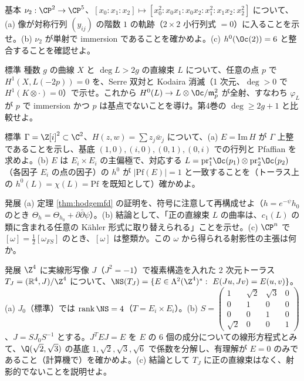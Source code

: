 \begin{prob}{基本}\label{p:veronese}
$\nu_2:\CP^2\to\CP^5$、$[x_0:x_1:x_2]\mapsto[x_0^2:x_0x_1:x_0x_2:x_1^2:x_1x_2:x_2^2]$ について、(a) 像が対称行列 $(y_{ij})$ の階数 $1$ の軌跡（$2\times2$ 小行列式 $=0$）に入ることを示せ。(b) $\nu_2$ が単射で immersion であることを確かめよ。(c) $h^0(\Oc(2))=6$ と整合することを確認せよ。
\end{prob}
\begin{prob}{標準}\label{p:curvejets}
種数 $g$ の曲線 $X$ と $\deg L>2g$ の直線束 $L$ について、任意の点 $p$ で $H^1(X,L(-2p))=0$ を、Serre 双対と Kodaira 消滅（1 次元、$\deg>0$ で $H^1(K\otimes\cdot)=0$）で示せ。これから $H^0(L)\to L\otimes\Oc/\mathfrak m_p^2$ が全射、すなわち $\varphi_L$ が $p$ で immersion かつ $p$ は基点でないことを導け。第4巻の $\deg\ge2g+1$ と比較せよ。
\end{prob}
\begin{prob}{標準}\label{p:torusPolar}
$\Gamma=\Z[i]^2\subset\C^2$、$H(z,w)=\sum z_j\bar w_j$ について、(a) $E=\mathrm{Im}\,H$ が $\Gamma$ 上整であることを示し、基底 $(1,0),(i,0),(0,1),(0,i)$ での行列と Pfaffian を求めよ。(b) $E$ は $E_i\times E_i$ の主偏極で、対応する $L=\mathrm{pr}_1^*\Oc(p_1)\otimes\mathrm{pr}_2^*\Oc(p_2)$（各因子 $E_i$ の点の因子）の $h^0$ が $|\mathrm{Pf}(E)|=1$ と一致することを（トーラス上の $h^0(L)=\chi(L)=\mathrm{Pf}$ を既知として）確かめよ。
\end{prob}
\begin{prob}{発展}\label{p:integralKahler}
(a) 定理 \ref{thm:hodgemfd} の証明を、符号に注意して再構成せよ（$h=e^{-\psi}h_0$ のとき $\Theta_h=\Theta_{h_0}+\partial\bar\partial\psi$）。(b) 結論として、「正の直線束 $L$ の曲率は、$c_1(L)$ の類に含まれる任意の Kähler 形式に取り替えられる」ことを示せ。(c) $\CP^n$ で $[\omega]=\frac12[\omega_{FS}]$ のとき、$[\omega]$ は整類か。この $\omega$ から得られる射影性の主張は何か。
\end{prob}
\begin{prob}{発展}\label{p:torusNS}
$\Z^4$ に実線形写像 $J$（$J^2=-1$）で複素構造を入れた 2 次元トーラス $T_J=(\mathbb R^4,J)/\Z^4$ について、$\NS(T_J)=\{E\in\Lambda^2(\Z^4)^*:\ E(Ju,Jv)=E(u,v)\}$。(a) $J_0$（標準）では $\mathrm{rank}\,\NS=4$（$T=E_i\times E_i$）。(b) $S=\begin{pmatrix}1&\sqrt2&\sqrt3&0\\0&1&0&0\\0&0&1&0\\\sqrt2&0&0&1\end{pmatrix}$、$J=SJ_0S^{-1}$ とする。$J^T E J=E$ を $E$ の 6 個の成分についての線形方程式とみて、$\Q(\sqrt2,\sqrt3)$ の基底 $1,\sqrt2,\sqrt3,\sqrt6$ で係数を分解し、有理解が $E=0$ のみであること（計算機で）を確かめよ。(c) 結論として $T_J$ に正の直線束はなく、射影的でないことを説明せよ。
\end{prob}

